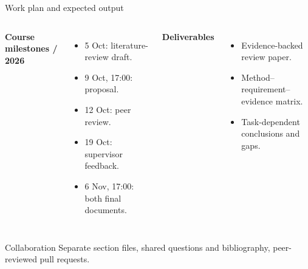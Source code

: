 \begin{frame}{Work plan and expected output}
\begin{columns}[T,onlytextwidth]
\textbf{Course milestones / 2026}
\begin{itemize}
\item 5 Oct: literature-review draft.
\item 9 Oct, 17:00: proposal.
\item 12 Oct: peer review.
\item 19 Oct: supervisor feedback.
\item 6 Nov, 17:00: both final documents.
\end{itemize}
\textbf{Deliverables}
\begin{itemize}
\item Evidence-backed review paper.
\item Method--requirement--evidence matrix.
\item Task-dependent conclusions and gaps.
\end{itemize}
\end{columns}
\vspace{4mm}
\begin{block}{Collaboration}
Separate section files, shared questions and bibliography, peer-reviewed pull requests.
\end{block}
\end{frame}

